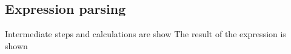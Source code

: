 \documentclass[11pt,a4paper]{article}
\begin{document}
\subsection{Expression parsing}
Intermediate steps and calculations are show
The result of the expression is shown
\end{document}
